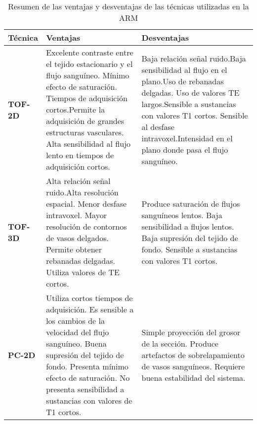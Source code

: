 \begin{table}[p]
\centering
\caption{Resumen de las ventajas y desventajas de las técnicas utilizadas en la ARM}
\label{tab:angio}
\begin{tabular}{l p{6cm} p{6cm}}
\toprule
\textbf{Técnica} & \textbf{Ventajas}                                                                                                                                                                                                                                           & \textbf{Desventajas}                                                                                                                                                                                                                                 \\ \midrule
\textbf{TOF-2D}  & Excelente contraste entre el tejido estacionario y el flujo sanguíneo. Mínimo efecto de saturación. Tiempos de adquisición cortos.Permite la adquisición de grandes estructuras vasculares. Alta sensibilidad al flujo lento en tiempos de adquisición cortos. & Baja relación señal ruido.Baja sensibilidad al flujo en el plano.Uso de rebanadas delgadas. Uso de valores TE largos.Sensible a sustancias con valores T1 cortos. Sensible al desfase intravoxel.Intensidad en el plano donde pasa el flujo sanguíneo. \\
\textbf{TOF-3D}  & Alta relación señal ruido.Alta resolución espacial. Menor desfase intravoxel. Mayor resolución de contornos de vasos delgados. Permite obtener rebanadas delgadas. Utiliza valores de TE cortos.                                                                & Produce saturación de flujos sanguíneos lentos. Baja sensibilidad a flujos lentos. Baja supresión del tejido de fondo. Sensible a sustancias con valores T1 cortos.                                                                                     \\
\textbf{PC-2D}   & Utiliza cortos tiempos de adquisición. Es sensible a los cambios de la velocidad del flujo sanguíneo. Buena supresión del tejido de fondo. Presenta mínimo efecto de saturación. No presenta sensibilidad a sustancias con valores de T1 cortos.                & Simple proyección del grosor de la sección. Produce artefactos de sobrelapamiento de vasos sanguíneos. Requiere buena estabilidad del sistema.                                                                                                         \\

\end{tabular}
\end{table}
